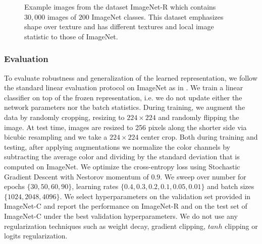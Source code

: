 \documentclass{article}
\begin{document}
\begin{figure}
\centering
{}
\caption{Example images from the dataset ImageNet-R which contains $30,000$ images of $200$ ImageNet classes. 
This dataset emphasizes shape over texture and has different textures and local image statistic to those of ImageNet.}
\label{imagenet_r}
\end{figure}




\subsubsection{Evaluation} \label{sec:robust_app.eval}
To evaluate robustness and generalization of the learned representation, we follow the standard linear evaluation protocol on ImageNet as in \citep{Chen2020ImprovedBW, chen2020simple, Kolesnikov2019RevisitingSV}.
We train a linear classifier on top of the frozen representation, i.e. we do not update either the network parameters nor the batch statistics. 
During training, we augment the data by randomly cropping, resizing to $224 \times 224$ and randomly flipping the image. 
At test time, images are resized to 256 pixels along the shorter side via bicubic resampling and we take a $224\times 224$ center crop. 
Both during training and testing, after applying augmentations we normalize the color channels by subtracting the average color and dividing by the standard deviation that is computed on ImageNet.
We optimize the cross-entropy loss using Stochastic Gradient Descent with Nestorov momentum of $0.9$.
We sweep over number for epochs $\{30, 50, 60, 90\}$, learning rates $\{0.4, 0.3, 0.2, 0.1, 0.05, 0.01\}$ and batch sizes $\{1024, 2048, 4096\}$. 
We select hyperparameters on the validation set provided in ImageNet-C and report the performance on ImageNet-R and on the test set of ImageNet-C under the best validation hyperparameters.
We do not use any regularization techniques such as weight decay, gradient clipping, $tanh$ clipping or logits regularization.
\end{document}
